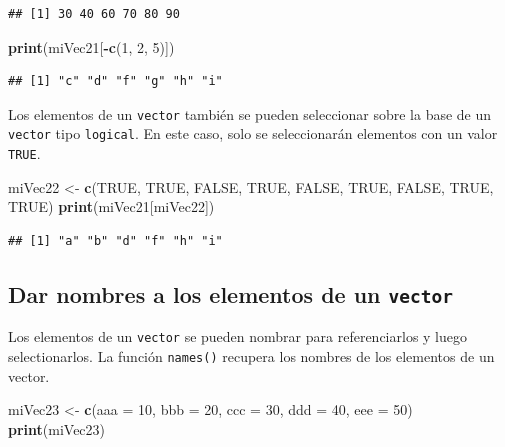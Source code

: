 \documentclass[
]{book}
\newenvironment{Shaded}{\begin{snugshade}}{\end{snugshade}}
\newcommand{\DataTypeTok}[1]{\textcolor[rgb]{0.13,0.29,0.53}{#1}}
\newcommand{\DecValTok}[1]{\textcolor[rgb]{0.00,0.00,0.81}{#1}}
\newcommand{\KeywordTok}[1]{\textcolor[rgb]{0.13,0.29,0.53}{\textbf{#1}}}
\newcommand{\NormalTok}[1]{#1}
\newcommand{\OperatorTok}[1]{\textcolor[rgb]{0.81,0.36,0.00}{\textbf{#1}}}
\newcommand{\OtherTok}[1]{\textcolor[rgb]{0.56,0.35,0.01}{#1}}
\newcommand{\StringTok}[1]{\textcolor[rgb]{0.31,0.60,0.02}{#1}}
\begin{document}
\begin{verbatim}
## [1] 30 40 60 70 80 90
\end{verbatim}

\begin{Shaded}
\begin{Highlighting}[]
\KeywordTok{print}\NormalTok{(miVec21[}\OperatorTok{-}\KeywordTok{c}\NormalTok{(}\DecValTok{1}\NormalTok{, }\DecValTok{2}\NormalTok{, }\DecValTok{5}\NormalTok{)])}
\end{Highlighting}
\end{Shaded}

\begin{verbatim}
## [1] "c" "d" "f" "g" "h" "i"
\end{verbatim}

Los elementos de un \texttt{vector} también se pueden seleccionar sobre la base de un \texttt{vector} tipo \texttt{logical}. En este caso, solo se seleccionarán elementos con un valor \texttt{TRUE}.

\begin{Shaded}
\begin{Highlighting}[]
\NormalTok{miVec22 <-}\StringTok{ }\KeywordTok{c}\NormalTok{(}\OtherTok{TRUE}\NormalTok{, }\OtherTok{TRUE}\NormalTok{, }\OtherTok{FALSE}\NormalTok{, }\OtherTok{TRUE}\NormalTok{, }\OtherTok{FALSE}\NormalTok{, }\OtherTok{TRUE}\NormalTok{, }\OtherTok{FALSE}\NormalTok{, }\OtherTok{TRUE}\NormalTok{, }\OtherTok{TRUE}\NormalTok{)}
\KeywordTok{print}\NormalTok{(miVec21[miVec22])}
\end{Highlighting}
\end{Shaded}

\begin{verbatim}
## [1] "a" "b" "d" "f" "h" "i"
\end{verbatim}

\hypertarget{dar-nombres-a-los-elementos-de-un-vector}{%
\subsection{\texorpdfstring{Dar nombres a los elementos de un \texttt{vector}}{Dar nombres a los elementos de un vector}}\label{dar-nombres-a-los-elementos-de-un-vector}}

Los elementos de un \texttt{vector} se pueden nombrar para referenciarlos y luego selectionarlos. La función \texttt{names()} recupera los nombres de los elementos de un vector.

\begin{Shaded}
\begin{Highlighting}[]
\NormalTok{miVec23 <-}\StringTok{ }\KeywordTok{c}\NormalTok{(}\DataTypeTok{aaa =} \DecValTok{10}\NormalTok{, }\DataTypeTok{bbb =} \DecValTok{20}\NormalTok{, }\DataTypeTok{ccc =} \DecValTok{30}\NormalTok{, }\DataTypeTok{ddd =} \DecValTok{40}\NormalTok{, }\DataTypeTok{eee =} \DecValTok{50}\NormalTok{)}
\KeywordTok{print}\NormalTok{(miVec23)}
\end{Highlighting}
\end{Shaded}
\end{document}
